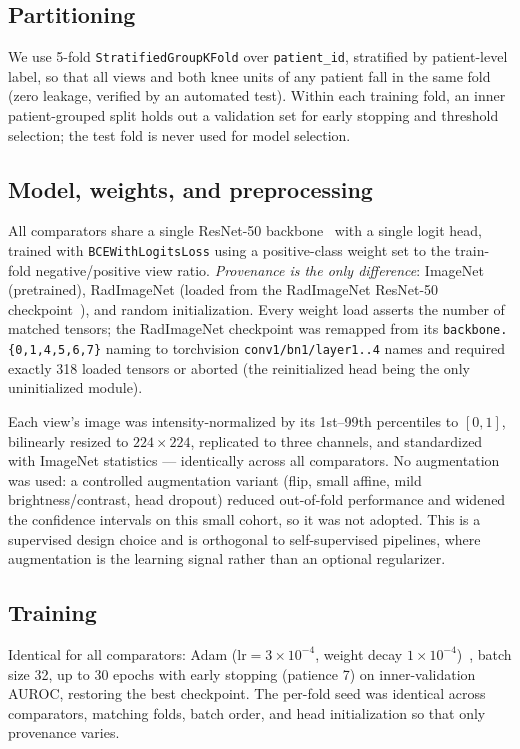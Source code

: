 \documentclass[conference]{IEEEtran}
\begin{document}
\subsection{Partitioning}
We use 5-fold \texttt{StratifiedGroupKFold} over \texttt{patient\_id}, stratified by
patient-level label, so that all views and both knee units of any patient fall in the
same fold (zero leakage, verified by an automated test). Within each training fold, an
inner patient-grouped split holds out a validation set for early stopping and
threshold selection; the test fold is never used for model selection.

\subsection{Model, weights, and preprocessing}
All comparators share a single ResNet-50 backbone~\cite{he16resnet} with a single
logit head, trained with \texttt{BCEWithLogitsLoss} using a positive-class weight set
to the train-fold negative/positive view ratio. \emph{Provenance is the only
difference}: ImageNet (pretrained), RadImageNet (loaded from the RadImageNet
ResNet-50 checkpoint~\cite{mei22radimagenet}), and random initialization. Every
weight load asserts the number of matched tensors; the RadImageNet checkpoint was
remapped from its \texttt{backbone.\{0,1,4,5,6,7\}} naming to torchvision
\texttt{conv1/bn1/layer1..4} names and required exactly 318 loaded tensors or aborted
(the reinitialized head being the only uninitialized module).

Each view's image was intensity-normalized by its 1st--99th percentiles to $[0,1]$,
bilinearly resized to $224\times224$, replicated to three channels, and standardized
with ImageNet statistics --- identically across all comparators. No augmentation was
used: a controlled augmentation variant (flip, small affine, mild
brightness/contrast, head dropout) reduced out-of-fold performance and widened the
confidence intervals on this small cohort, so it was not adopted. This is a supervised
design choice and is orthogonal to self-supervised pipelines, where augmentation is
the learning signal rather than an optional regularizer.

\subsection{Training}
Identical for all comparators: Adam ($\text{lr}=3\times10^{-4}$, weight decay
$1\times10^{-4}$)~\cite{kingma15adam}, batch size 32, up to 30 epochs with early
stopping (patience 7) on inner-validation AUROC, restoring the best checkpoint. The
per-fold seed was identical across comparators, matching folds, batch order, and head
initialization so that only provenance varies.
\end{document}
